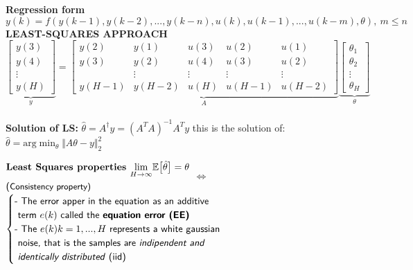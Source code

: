 \documentclass[a4paper, 12pt]{article}
\begin{document}
\noindent
\textbf{Regression form}
$y(k)=f(y(k-1), y(k-2), ...,y(k-n), u(k), u(k-1), ..., u(k-m), \theta), \ m\le n$\\

\noindent
\textbf{\color{blue}LEAST-SQUARES APPROACH} \\
\begin{equation*}
    \underbrace{\begin{bmatrix}
    y(3)\\y(4)\\\vdots\\y(H)
\end{bmatrix}}_{y} 
=\underbrace{ 
\begin{bmatrix}
    y(2)&y(1)&u(3)&u(2)&u(1)\\
    y(3)&y(2)&u(4)&u(3)&u(2)\\
    &\vdots&\vdots&\vdots&\vdots\\
    y(H-1)&y(H-2)&u(H)&u(H-1)&u(H-2)
\end{bmatrix}}_{A} \underbrace{\begin{bmatrix}
    \theta_1\\\theta_2\\\vdots\\\theta_H
\end{bmatrix}}_{\theta}\end{equation*}\\
\textbf{Solution of LS: } $\hat{\theta} = A^\dagger y = (A^TA)^{-1}A^T y$ this is the solution of: $ \hat{\theta} = \text{arg}\min_\theta \Vert A\theta-y\Vert_2^2$

\noindent
$\begin{aligned}
    &\textbf{Least Squares properties } 
    \underset{H\to\infty}{\lim} \mathbb{E}\big[\hat{\theta}\big] = \theta\\
    &\textsf{(\small Consistency property)}  
\end{aligned}
$
$\iff$ $\begin{cases}
    \textsf{- The error apper in the equation as an additive  }\\
    \textsf{ term $e(k)$ called the \textbf{equation error (EE)}}\\
    \textsf{- The $e(k) k=1,...,H$ represents a white gaussian }\\
    \textsf{ noise, that is the samples are \textit{indipendent and}}\\
    \textsf{\textit{ identically distributed} (iid)}
\end{cases}$ \\
\end{document}
